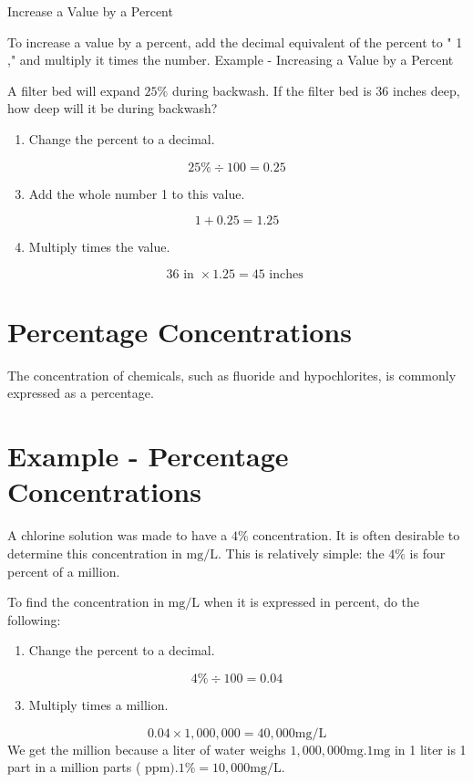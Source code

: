 \documentclass[10pt]{article}
\begin{document}
Increase a Value by a Percent

To increase a value by a percent, add the decimal equivalent of the percent to " 1 ," and multiply it times the number. Example - Increasing a Value by a Percent

A filter bed will expand $25 \%$ during backwash. If the filter bed is 36 inches deep, how deep will it be during backwash?

\begin{enumerate}
  \item Change the percent to a decimal.
\end{enumerate}
$$
25 \% \div 100=0.25
$$

\begin{enumerate}
  \setcounter{enumi}{2}
  \item Add the whole number 1 to this value.
\end{enumerate}
$$
1+0.25=1.25
$$

\begin{enumerate}
  \setcounter{enumi}{3}
  \item Multiply times the value.
\end{enumerate}
$$
36 \text { in } \times 1.25=45 \text { inches }
$$

\section{Percentage Concentrations}
The concentration of chemicals, such as fluoride and hypochlorites, is commonly expressed as a percentage.

\section{Example - Percentage Concentrations}
A chlorine solution was made to have a $4 \%$ concentration. It is often desirable to determine this concentration in $\mathrm{mg} / \mathrm{L}$. This is relatively simple: the $4 \%$ is four percent of a million.

To find the concentration in $\mathrm{mg} / \mathrm{L}$ when it is expressed in percent, do the following:

\begin{enumerate}
  \item Change the percent to a decimal.
\end{enumerate}
$$
4 \% \div 100=0.04
$$

\begin{enumerate}
  \setcounter{enumi}{2}
  \item Multiply times a million.
\end{enumerate}
$$
0.04 \times 1,000,000=40,000 \mathrm{mg} / \mathrm{L}
$$
We get the million because a liter of water weighs $1,000,000 \mathrm{mg} .1 \mathrm{mg}$ in 1 liter is 1 part in a million parts ( $\mathrm{ppm}) .1 \%=10,000 \mathrm{mg} / \mathrm{L}$.
\end{document}
